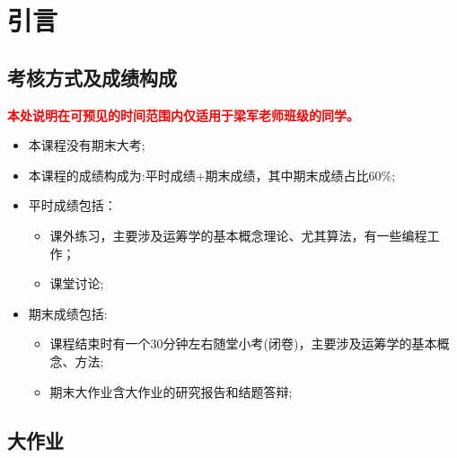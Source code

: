 \ifx\allfiles\undefined

	
	
\else
\fi
    \chapter{引言}
	\section{考核方式及成绩构成}
	\textcolor{red}{\textbf{本处说明在可预见的时间范围内仅适用于梁军老师班级的同学。}}
	\begin{itemize}
	\item 本课程没有期末大考;
	\item 本课程的成绩构成为:平时成绩+期末成绩，其中期末成绩占比60\%;
	\item 平时成绩包括：
	\begin{itemize}
		\item 课外练习，主要涉及运筹学的基本概念理论、尤其算法，有一些编程工作；
		\item 课堂讨论;
	\end{itemize}
	\item 期末成绩包括:
	\begin{itemize}
		\item 课程结束时有一个30分钟左右随堂小考(闭卷)，主要涉及运筹学的基本概念、方法;
		\item 期末大作业含大作业的研究报告和结题答辩;
	\end{itemize}
	\end{itemize}

	\section{大作业}
